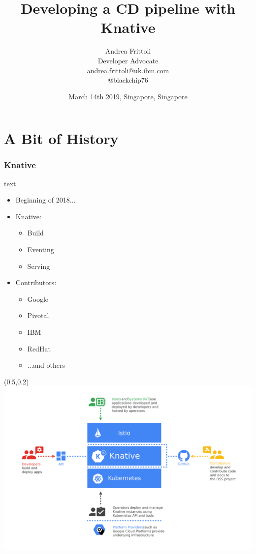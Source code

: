 \documentclass[aspectratio=169,11pt,hyperref={colorlinks=true}]{beamer}
\title{Developing a CD pipeline with Knative}
\date[DevOps Meetup]{March 14th 2019, Singapore, Singapore}
\author[Andrea]{
  Andrea Frittoli \\
  Developer Advocate \\
  andrea.frittoli@uk.ibm.com \\
  @blackchip76
}
\institute[DevOpsMeetupSingapore]{
  DevOps Meetup Singapore
}
\begin{document}
\begin{frame}[noframenumbering]
\titlepage{}
\end{frame}



\section{A Bit of History}

\begin{lblackrwhiteframe}
  \frametitle{Knative}
  \large
  \begin{beamercolorbox}[wd=0.3\paperwidth]{text}
    \begin{itemize}
      \item Beginning of 2018...
      \item Knative:
      \begin{itemize}
        \item Build
        \item Eventing
        \item Serving
      \end{itemize}
    \end{itemize}
    \begin{itemize}
      \item Contributors:
      \begin{itemize}
        \item Google
        \item Pivotal
        \item IBM
        \item RedHat
        \item ...and others
      \end{itemize}
    \end{itemize}
  \end{beamercolorbox}%
  \begin{textblock*}{0.5\paperwidth}(0.5\paperwidth,0.2\paperheight)
    \centering
    \includegraphics[width=0.45\paperwidth]{img/knative-audience.png}

\end{textblock*}
\end{lblackrwhiteframe}
\end{document}
